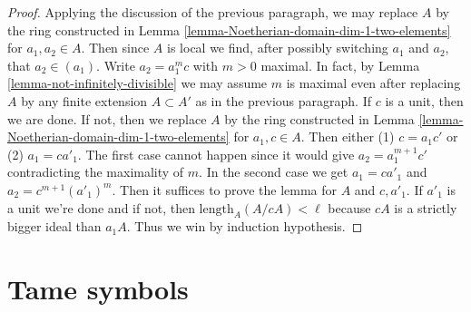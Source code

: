 \begin{proof}
\medskip\noindent
Applying the discussion of the previous paragraph,
we may replace $A$ by the ring constructed in
Lemma \ref{lemma-Noetherian-domain-dim-1-two-elements}
for $a_1, a_2 \in A$. Then since $A$ is local we find,
after possibly switching $a_1$ and $a_2$, that $a_2 \in (a_1)$.
Write $a_2 = a_1^m c$ with $m > 0$ maximal. In fact, by
Lemma \ref{lemma-not-infinitely-divisible}
we may assume $m$ is maximal even after replacing $A$
by any finite extension $A \subset A'$ as in the previous paragraph.
If $c$ is a unit, then we are done. If not, then we replace
$A$ by the ring constructed in
Lemma \ref{lemma-Noetherian-domain-dim-1-two-elements}
for $a_1, c \in A$. Then either (1) $c = a_1 c'$ or
(2) $a_1 = c a'_1$. The first case cannot happen since
it would give $a_2 = a_1^{m + 1} c'$ contradicting the
maximality of $m$. In the second case we get
$a_1 = c a'_1$ and $a_2 = c^{m + 1} (a'_1)^m$.
Then it suffices to prove the lemma for $A$ and $c, a'_1$.
If $a'_1$ is a unit we're done and if not, then
$\text{length}_A(A/cA) < \ell$ because $cA$ is a strictly
bigger ideal than $a_1A$. Thus we win by induction hypothesis.
\end{proof}






\section{Tame symbols}
\label{section-tame-symbol}

